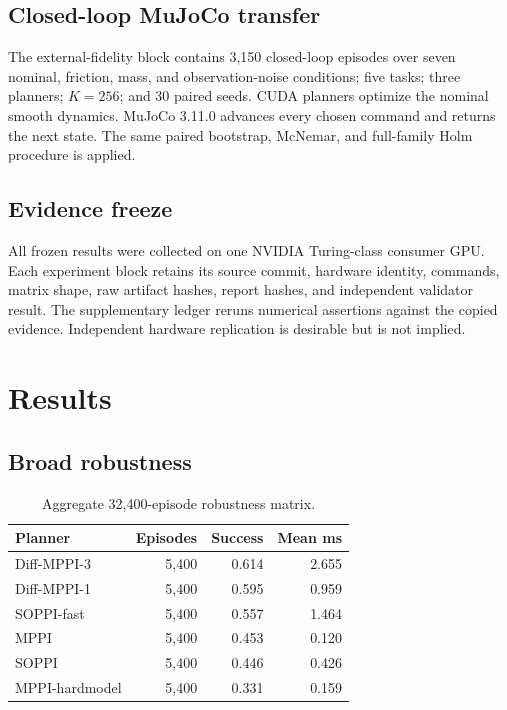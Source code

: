 \documentclass[conference]{IEEEtran}
\begin{document}
\subsection{Closed-loop MuJoCo transfer}

The external-fidelity block contains 3,150 closed-loop episodes over seven
nominal, friction, mass, and observation-noise conditions; five tasks; three
planners; \(K=256\); and 30 paired seeds.  CUDA planners optimize the nominal
smooth dynamics.  MuJoCo 3.11.0 advances every chosen command and returns the
next state.  The same paired bootstrap, McNemar, and full-family Holm procedure
is applied.

\subsection{Evidence freeze}

All frozen results were collected on one NVIDIA Turing-class consumer GPU.  Each
experiment block retains its source commit, hardware identity, commands,
matrix shape, raw artifact hashes, report hashes, and independent validator
result.  The supplementary ledger reruns numerical assertions against the
copied evidence.  Independent hardware replication is desirable but is not
implied.

\section{Results}

\subsection{Broad robustness}

\begin{table}[t]
\centering
\caption{Aggregate 32,400-episode robustness matrix.}
\label{tab:robustness}
\begin{tabular}{lrrr}
\toprule
Planner & Episodes & Success & Mean ms \\
\midrule
Diff-MPPI-3    & 5,400 & 0.614 & 2.655 \\
Diff-MPPI-1    & 5,400 & 0.595 & 0.959 \\
SOPPI-fast     & 5,400 & 0.557 & 1.464 \\
MPPI           & 5,400 & 0.453 & 0.120 \\
SOPPI          & 5,400 & 0.446 & 0.426 \\
MPPI-hardmodel & 5,400 & 0.331 & 0.159 \\
\bottomrule
\end{tabular}
\end{table}
\end{document}
